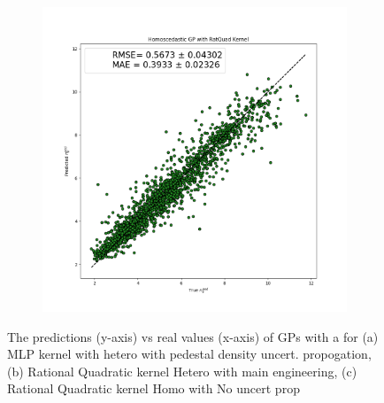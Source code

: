 \documentclass[a4paper, twoside, final, 12pt]{article}
\begin{document}
{\begin{figure}
\begin{subfigure}{0.33\linewidth}
		\caption{}
		\label{subfig:hetero_gp_neped}
	\end{subfigure}
	\begin{subfigure}{0.33\linewidth}
		\centering
		\includegraphics[scale=0.2]{./src/GP_RatQuad_HomoDesiastic_preds}
		\caption{}
		\label{subfig:homo_gp}
	\end{subfigure}
	\caption{The predictions (y-axis) vs real values (x-axis) of GPs with a for (a) MLP kernel with hetero with pedestal density uncert. propogation, (b) Rational Quadratic kernel Hetero with main engineering, (c) Rational Quadratic kernel Homo with No uncert prop}
	\label{fig:gp_prediction}
\end{figure}
\begin{figure}
	\begin{subfigure}{0.3\linewidth}
		\centering

\end{subfigure}
\end{figure}}
\end{document}
